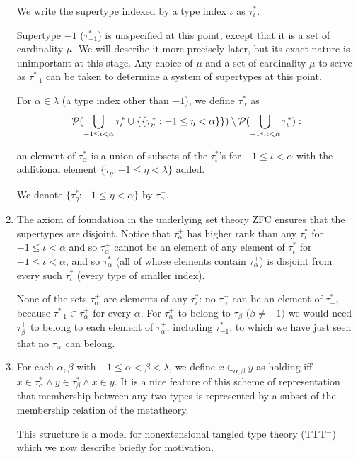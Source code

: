 \documentclass[12pt]{article}
\begin{document}
\begin{enumerate}
We write the supertype indexed by a type index $\iota$ as $\tau^*_\iota$.

Supertype $-1$ ($\tau^*_{-1}$) is unspecified at this point, except that it is a set of cardinality $\mu$.  We will describe it more precisely later, but its exact nature is unimportant at this stage.  Any choice of $\mu$ and a set of cardinality $\mu$ to serve as $\tau^*_{-1}$ can be taken to determine a system of supertypes at this point.

For $\alpha\in \lambda$ (a type index other than $-1$), we define $\tau^*_\alpha$ as $${\cal P} (\bigcup_{-1 \leq \iota<\alpha} \tau^*_\iota \cup \{\{\tau^*_\eta:-1\leq \eta <\alpha\}\}) \setminus {\cal P} (\bigcup_{-1 \leq \iota<\alpha}\tau^*_\iota):$$

an element of $\tau^*_\alpha$ is a union of subsets of the $\tau^*_\iota$'s for $-1\leq \iota <\alpha$ with the additional element $\{\tau_\eta:-1\leq \eta <\lambda\}$ added.

We denote $\{\tau^*_\eta:-1\leq \eta <\alpha\}$ by $\tau^+_{\alpha}$.

\item The axiom of foundation in the underlying set theory ZFC ensures that the supertypes are disjoint.  Notice that $\tau^+_{\alpha}$ has higher rank than any $\tau^*_\iota$ for
$-1\leq \iota <\alpha$ and so $\tau^+_{\alpha}$ cannot be an element of any element of $\tau^*_\iota$ for $-1\leq \iota<\alpha$, and so $\tau^*_\alpha$ (all of whose elements contain $\tau^+_{\alpha}$)  is disjoint from every
such $\tau^*_\iota$ (every type of smaller index).

None of the sets $\tau^+_{\alpha}$ are elements of any $\tau^*_\iota$:  no  $\tau^+_{\alpha}$ can be an element of $\tau^*_{-1}$ because $\tau^*_{-1} \in \tau^+_{\alpha}$ for every
$\alpha$.  For $\tau^+_{\alpha}$ to belong to $\tau_\beta$ ($\beta \neq -1)$ we would need $\tau^+_{\beta}$ to belong to each element of $\tau^+_\alpha$, including
$\tau^*_{-1}$, to which we have just seen that no $\tau^+_{\alpha}$ can belong.

\item For each $\alpha,\beta$ with $-1\leq\alpha<\beta<\lambda$, we define $x \in_{\alpha,\beta} y$ as holding iff $x \in \tau^*_\alpha \wedge y \in \tau^*_\beta \wedge x \in y$.  It is a nice feature of this scheme of representation that membership
between any two types is represented by a subset of the membership relation of the metatheory.

This structure is a model for nonextensional tangled type theory (TTT$^-$) which we now describe briefly for motivation.


\end{enumerate}
\end{document}
